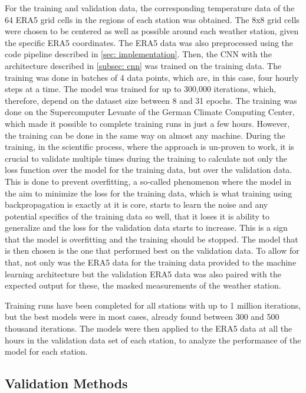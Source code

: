 For the training and validation data, the corresponding temperature data of the 64 ERA5 grid cells in the regions of each station was obtained.
The 8x8 grid cells were chosen to be centered as well as possible around each weather station, given the specific ERA5 coordinates.
The ERA5 data was also preprocessed using the code pipeline described in \autoref{sec: implementation}.
Then, the CNN with the architecture described in \autoref{subsec: cnn} was trained on the training data.
The training was done in batches of 4 data points, which are, in this case, four hourly steps at a time.
The model was trained for up to 300,000 iterations, which, therefore, depend on the dataset size between 8 and 31 epochs. The training was done on the Supercomputer Levante of the German Climate Computing Center, which made it possible to complete training runs in just a few hours.
However, the training can be done in the same way on almost any machine.
During the training, in the scientific process, where the approach is un-proven to work, it is crucial to validate multiple times during the training to calculate not only the loss function over the model for the training data, but over the validation data.
This is done to prevent overfitting, a so-called phenomenon where the model in the aim to minimize the loss for the training data, which is what training using backpropagation is exactly at it is core, starts to learn the noise and any potential specifics of the training data so well, that it loses it is ability to generalize and the loss for the validation data starts to increase.
This is a sign that the model is overfitting and the training should be stopped. The model that is then chosen is the one that performed best on the validation data.
To allow for that, not only was the ERA5 data for the training data provided to the machine learning architecture but the validation ERA5 data was also paired with the expected output for these, the masked measurements of the weather station.

Training runs have been completed for all stations with up to 1 million iterations, but the best models were in most cases, already found between 300 and 500 thousand iterations.
The models were then applied to the ERA5 data at all the hours in the validation data set of each station, to analyze the performance of the model for each station. 

\subsection{Validation Methods}

